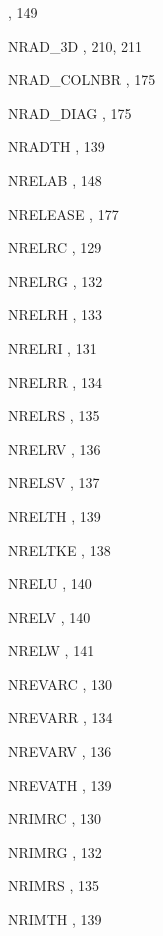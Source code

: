 \begin{theindex}
    \subitem {},  149
  \item NRAD\_3D
    \subitem {},  210, 211
  \item NRAD\_COLNBR
    \subitem {},  175
  \item NRAD\_DIAG
    \subitem {},  175
  \item NRADTH
    \subitem {},  139
  \item NRELAB
    \subitem {},  148
  \item NRELEASE
    \subitem {},  177
  \item NRELRC
    \subitem {},  129
  \item NRELRG
    \subitem {},  132
  \item NRELRH
    \subitem {},  133
  \item NRELRI
    \subitem {},  131
  \item NRELRR
    \subitem {},  134
  \item NRELRS
    \subitem {},  135
  \item NRELRV
    \subitem {},  136
  \item NRELSV
    \subitem {},  137
  \item NRELTH
    \subitem {},  139
  \item NRELTKE
    \subitem {},  138
  \item NRELU
    \subitem {},  140
  \item NRELV
    \subitem {},  140
  \item NRELW
    \subitem {},  141
  \item NREVARC
    \subitem {},  130
  \item NREVARR
    \subitem {},  134
  \item NREVARV
    \subitem {},  136
  \item NREVATH
    \subitem {},  139
  \item NRIMRC
    \subitem {},  130
  \item NRIMRG
    \subitem {},  132
  \item NRIMRS
    \subitem {},  135
  \item NRIMTH
    \subitem {},  139

\end{theindex}
